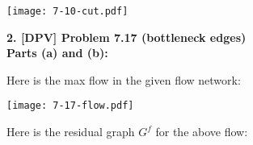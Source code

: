 \documentclass{article}
\begin{document}
\centerline{\texttt{[image: 7-10-cut.pdf]}}

%
%


\newpage


	
{\noindent \bf  2. [DPV] Problem 7.17  (bottleneck edges)  }\\
	
	
{\noindent \bf Parts (a) and (b):}

Here is the max flow in the given flow network:
	
\centerline{\texttt{[image: 7-17-flow.pdf]}}


Here is the residual graph $G^f$ for the above flow:

	
\end{document}
